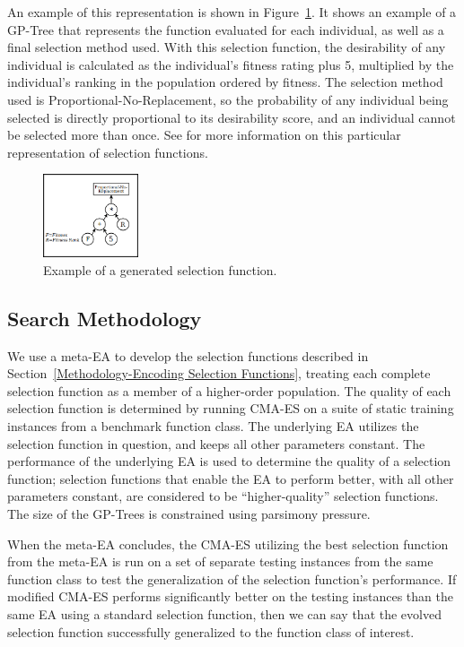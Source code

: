 \documentclass[sigconf]{acmart}
\begin{document}
An example of this representation is shown in Figure~\ref{fig:example_eppsea_nolabel}. It shows an example of a GP-Tree that represents the function evaluated for each individual, as well as a final selection method used. With this selection function, the desirability of any individual is calculated as the individual's fitness rating plus 5, multiplied by the individual's ranking in the population ordered by fitness. The selection method used is Proportional-No-Replacement, so the probability of any individual being selected is directly proportional to its desirability score, and an individual cannot be selected more than once. See \citep{richter2019thesis} for more information on this particular representation of selection functions.

\begin{figure}
	\centering
	\includegraphics[width=0.25\textwidth]{example_eppsea_nolabel}
	\caption{Example of a generated selection function.}
	\label{fig:example_eppsea_nolabel}
\end{figure}

\subsection{Search Methodology}
\label{Methodology-Search Methodology}

We use a meta-EA to develop the selection functions described in Section~\ref{Methodology-Encoding Selection Functions}, treating each complete selection function as a member of a higher-order population. The quality of each selection function is determined by running CMA-ES on a suite of static training instances from a benchmark function class. The underlying EA utilizes the selection function in question, and keeps all other parameters constant. The performance of the underlying EA is used to determine the quality of a selection function; selection functions that enable the EA to perform better, with all other parameters constant, are considered to be ``higher-quality'' selection functions. The size of the GP-Trees is constrained using parsimony pressure.

When the meta-EA concludes, the CMA-ES utilizing the best selection function from the meta-EA is run on a set of separate testing instances from the same function class to test the generalization of the selection function's performance. If modified CMA-ES performs significantly better on the testing instances than the same EA using a standard selection function, then we can say that the evolved selection function successfully generalized to the function class of interest. 
\end{document}
